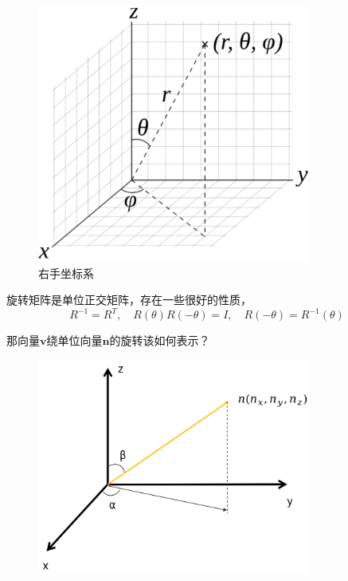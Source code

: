 \documentclass[hpyerref,UTF8,a4paper,titlepage,12pt,oneside]{ctexbook}
\theoremstyle{definition}
\begin{document}
\begin{figure}[H]
	\begin{center}
		\includegraphics[width=0.8\textwidth]{./images/righthandless.png}
		\caption{右手坐标系}
	\end{center}
\end{figure}


旋转矩阵是单位正交矩阵，存在一些很好的性质，
$$
	R^{-1} = R^T, \quad R(\theta)R(-\theta) = I,\quad R(-\theta)=R^{-1}(\theta)
$$

那向量$\mathbf{v}$绕单位向量$\mathbf{n}$的旋转该如何表示？\\

\begin{figure}[H]
	\begin{center}
		\includegraphics[width=0.8\textwidth]{./images/axis_rotation.png}
	\end{center}
\end{figure}
\end{document}
